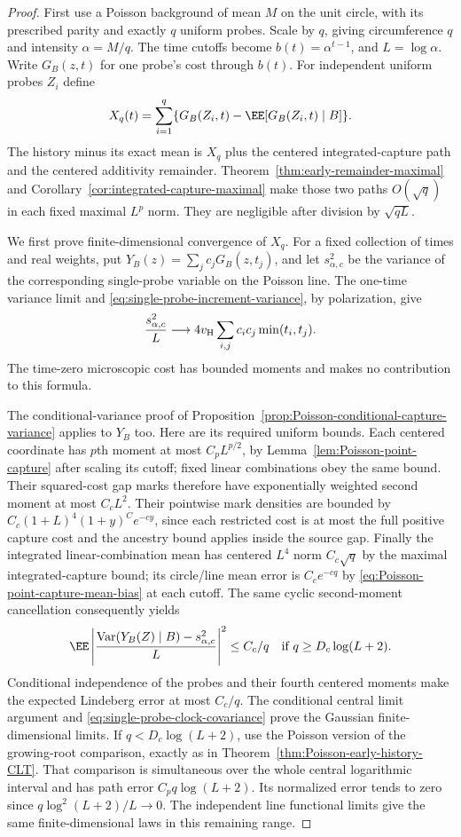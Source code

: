 \documentclass[11pt,letterpaper]{article}
\begin{document}
\begin{proof}
First use a Poisson background of mean $M$ on the unit circle,
with its prescribed parity and exactly $q$ uniform probes.
Scale by $q$, giving circumference $q$ and intensity
$\alpha=M/q$. The time cutoffs become
$b(t)=\alpha^{t-1}$, and $L=\log\alpha$.
Write $G_B(z,t)$ for one probe's cost through $b(t)$.
For independent uniform probes $Z_i$ define
\[
 X_q(t)=\sum_{i=1}^q
       \{G_B(Z_i,t)-\EE[G_B(Z_i,t)\mid B]\}.
\]
The history minus its exact mean is $X_q$ plus the centered
integrated-capture path and the centered additivity remainder.
Theorem~\ref{thm:early-remainder-maximal} and
Corollary~\ref{cor:integrated-capture-maximal} make those two
paths $O(\sqrt q)$ in each fixed maximal $L^p$ norm.
They are negligible after division by $\sqrt{qL}$.

We first prove finite-dimensional convergence of $X_q$.
For a fixed collection of times and real weights, put
$Y_B(z)=\sum_jc_jG_B(z,t_j)$, and let $s_{\alpha,c}^2$ be
the variance of the corresponding single-probe variable
on the Poisson line.
The one-time variance limit and
\eqref{eq:single-probe-increment-variance}, by polarization,
give
\begin{equation}\label{eq:single-probe-clock-covariance}
 \frac{s_{\alpha,c}^2}{L}\longrightarrow
       4v_{\rm H}\sum_{i,j}c_ic_j\min(t_i,t_j).
\end{equation}
The time-zero microscopic cost has bounded moments and makes
no contribution to this formula.

The conditional-variance proof of
Proposition~\ref{prop:Poisson-conditional-capture-variance}
applies to $Y_B$ too. Here are its required uniform bounds.
Each centered coordinate has $p$th moment at most $C_pL^{p/2}$,
by Lemma~\ref{lem:Poisson-point-capture} after scaling its
cutoff; fixed linear combinations obey the same bound.
Their squared-cost gap marks therefore have exponentially
weighted second moment at most $C_cL^2$.
Their pointwise mark densities are bounded by
$C_c(1+L)^4(1+y)^C e^{-cy}$, since each restricted cost is
at most the full positive capture cost and the ancestry
bound applies inside the source gap.
Finally the integrated linear-combination mean has centered
$L^4$ norm $C_c\sqrt q$ by the maximal integrated-capture bound;
its circle/line mean error is $C_ce^{-cq}$ by
\eqref{eq:Poisson-point-capture-mean-bias} at each cutoff.
The same cyclic second-moment cancellation consequently yields
\[
 \EE\left|
 \frac{\operatorname{Var}(Y_B(Z)\mid B)-s_{\alpha,c}^2}{L}
                         \right|^2\le C_c/q
       \quad\hbox{if }q\ge D_c\log(L+2).
\]
Conditional independence of the probes and their fourth
centered moments make the expected Lindeberg error at most
$C_c/q$. The conditional central limit argument and
\eqref{eq:single-probe-clock-covariance} prove the Gaussian
finite-dimensional limits.
If $q<D_c\log(L+2)$, use the Poisson version of the growing-root
comparison, exactly as in
Theorem~\ref{thm:Poisson-early-history-CLT}.
That comparison is simultaneous over the whole central
logarithmic interval and has path error $C_pq\log(L+2)$.
Its normalized error tends to zero since
$q\log^2(L+2)/L\to0$.
The independent line functional limits give the same
finite-dimensional laws in this remaining range.


\end{proof}
\end{document}
